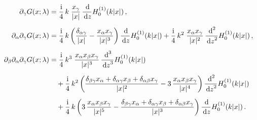 \begin{align*}
  \partial_\gamma G(x; \lambda) &= \frac{\ii}{4}\, k\;  \frac{x_\gamma}{|x|}\, \frac{\d{}}{\d z} H_0^{(1)}(k |x|)\,, \\[0.5em]
  \partial_\alpha \partial_\gamma G(x; \lambda) 
  &=  \frac{\ii}{4}\,  k \,\bigg(\frac{\delta_{\alpha\gamma}}{|x|} - \frac{x_\alpha x_\gamma}{|x|^3} \bigg)\, \frac{\d{}}{\d z} H_0^{(1)}(k |x|) + \frac{\ii}{4} \, k^2 \;  \frac{x_\alpha x_\gamma}{|x|^2} \, \frac{\d{}^2}{\d z^2} H_0^{(1)}(k |x|)\,, \\[0.5em]
  \partial_\beta \partial_\alpha \partial_\gamma G(x; \lambda)
  &= \frac{\ii}{4} \, k^3 \; \frac{x_\alpha x_\beta x_\gamma}{|x|^3} \, \frac{\d{}^3}{\d z^3} H_0^{(1)}(k |x|)\\[0.5em]
  &\quad + \frac{\ii}{4} \, k^2 \,\bigg(\frac{\delta_{\beta\gamma} x_\alpha + \delta_{\alpha \gamma} x_\beta + \delta_{\alpha \beta} x_\gamma}{|x|^2} - 3\, \frac{x_\alpha x_\beta x_\gamma}{|x|^4} \bigg)\, \frac{\d{}^2}{\d z^2} H_0^{(1)}(k |x|) \\[0.5em]
  &\quad+ \frac{\ii}{4} \, k \, \bigg( 3\, \frac{x_\alpha x_\beta x_\gamma}{|x|^5} - \frac{\delta_{\beta\gamma} x_\alpha + \delta_{\alpha\gamma} x_\beta + \delta_{\alpha\beta} x_\gamma}{|x|^3} \bigg)\, \frac{\d{}}{\d z} H_0^{(1)}(k |x|) \,.
\end{align*}

